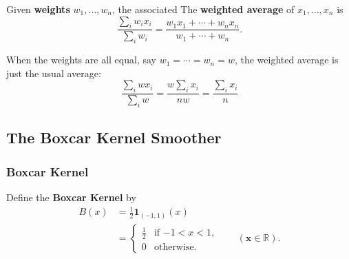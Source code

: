 \documentclass[xcolor={dvipsnames}]{beamer}
\newcommand{\vx}{\mathbf{x}}
\newcommand{\One}{\mathbf{1}}
\newcommand{\RR}{\mathbb{R}}
\begin{document}
\begin{frame}
    \setlength\parskip{0.75em}
    Given \textbf{weights} $w_1,\ldots,w_n$, the associated 
    The \textbf{weighted average} of $x_1,\ldots,x_n$ is
    \[
        \frac{\sum_i w_ix_i}{\sum_i w_i}=\frac{w_1x_1+\cdots + w_nx_n}{w_1+\cdots+w_n}.
    \]

    When the weights are all equal, say $w_1=\cdots=w_n=w$, the weighted average is just the usual average:
    \[
        \frac{\sum_i wx_i}{\sum_iw} = \frac{w\sum_ix_i}{nw}=\frac{\sum_ix_i}{n}
    \]
    \end{frame}

\subsection{The Boxcar Kernel Smoother}
\begin{frame}
    \frametitle{Boxcar Kernel}
    \setlength\parskip{0.75em}

    Define the \textbf{Boxcar Kernel} by
    \begin{align*}
        B(x) &= \frac12\One_{(-1, 1)}(x)\\[1ex]
        &=\begin{cases}
            \frac12&\text{if $-1<x<1$,}\\
            0&\text{otherwise.}
        \end{cases}\qquad (\vx\in\RR).
    \end{align*}

    \begin{center}
        \end{center}
\end{frame}
\end{document}
